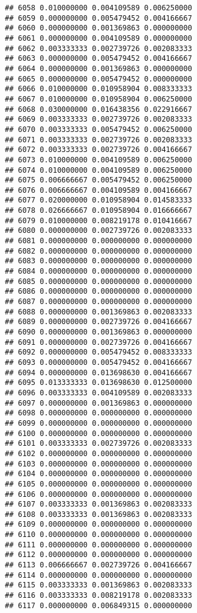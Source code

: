\documentclass[
]{article}
\begin{document}
\begin{verbatim}
## 6058 0.010000000 0.004109589 0.006250000
## 6059 0.000000000 0.005479452 0.004166667
## 6060 0.000000000 0.001369863 0.000000000
## 6061 0.000000000 0.004109589 0.000000000
## 6062 0.003333333 0.002739726 0.002083333
## 6063 0.000000000 0.005479452 0.004166667
## 6064 0.000000000 0.001369863 0.000000000
## 6065 0.000000000 0.005479452 0.000000000
## 6066 0.010000000 0.010958904 0.008333333
## 6067 0.010000000 0.010958904 0.006250000
## 6068 0.030000000 0.016438356 0.022916667
## 6069 0.003333333 0.002739726 0.002083333
## 6070 0.003333333 0.005479452 0.006250000
## 6071 0.003333333 0.002739726 0.002083333
## 6072 0.003333333 0.002739726 0.004166667
## 6073 0.010000000 0.004109589 0.006250000
## 6074 0.010000000 0.004109589 0.006250000
## 6075 0.006666667 0.005479452 0.006250000
## 6076 0.006666667 0.004109589 0.004166667
## 6077 0.020000000 0.010958904 0.014583333
## 6078 0.026666667 0.010958904 0.016666667
## 6079 0.010000000 0.008219178 0.010416667
## 6080 0.000000000 0.002739726 0.002083333
## 6081 0.000000000 0.000000000 0.000000000
## 6082 0.000000000 0.000000000 0.000000000
## 6083 0.000000000 0.000000000 0.000000000
## 6084 0.000000000 0.000000000 0.000000000
## 6085 0.000000000 0.000000000 0.000000000
## 6086 0.000000000 0.000000000 0.000000000
## 6087 0.000000000 0.000000000 0.000000000
## 6088 0.000000000 0.001369863 0.002083333
## 6089 0.000000000 0.002739726 0.004166667
## 6090 0.000000000 0.001369863 0.000000000
## 6091 0.000000000 0.002739726 0.004166667
## 6092 0.000000000 0.005479452 0.008333333
## 6093 0.000000000 0.005479452 0.004166667
## 6094 0.000000000 0.013698630 0.004166667
## 6095 0.013333333 0.013698630 0.012500000
## 6096 0.003333333 0.004109589 0.002083333
## 6097 0.000000000 0.001369863 0.000000000
## 6098 0.000000000 0.000000000 0.000000000
## 6099 0.000000000 0.000000000 0.000000000
## 6100 0.000000000 0.000000000 0.000000000
## 6101 0.003333333 0.002739726 0.002083333
## 6102 0.000000000 0.000000000 0.000000000
## 6103 0.000000000 0.000000000 0.000000000
## 6104 0.000000000 0.000000000 0.000000000
## 6105 0.000000000 0.000000000 0.000000000
## 6106 0.000000000 0.000000000 0.000000000
## 6107 0.003333333 0.001369863 0.002083333
## 6108 0.003333333 0.001369863 0.002083333
## 6109 0.000000000 0.000000000 0.000000000
## 6110 0.000000000 0.000000000 0.000000000
## 6111 0.000000000 0.000000000 0.000000000
## 6112 0.000000000 0.000000000 0.000000000
## 6113 0.006666667 0.002739726 0.004166667
## 6114 0.000000000 0.000000000 0.000000000
## 6115 0.003333333 0.001369863 0.002083333
## 6116 0.003333333 0.008219178 0.002083333
## 6117 0.000000000 0.006849315 0.000000000

\end{verbatim}
\end{document}
